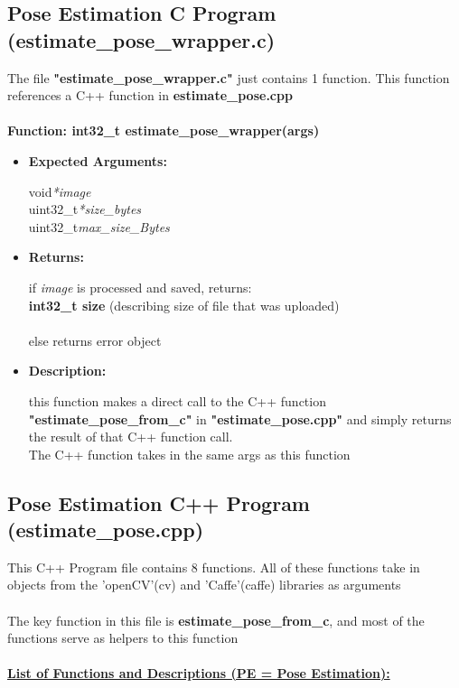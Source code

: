 \documentclass{scrreprt}
\begin{document}
\subsection{Pose Estimation C Program (estimate\_pose\_wrapper.c)}
The file \textbf{"estimate\_pose\_wrapper.c"} just contains 1 function. This function references a C++ function in \textbf{estimate\_pose.cpp}
\\\\
\textbf{Function: int32\_t estimate\_pose\_wrapper(args)}
\begin{itemize}
    \item \textbf{Expected Arguments:}

    void\quad\textit{*image}
    \\
    uint32\_t\quad\textit{*size\_bytes}
    \\
    uint32\_t\quad\textit{max\_size\_Bytes}

    \item\quad\textbf{Returns:}

    if \textit{image} is processed and saved, returns:\\\textbf{int32\_t size}
    (describing size of file that was uploaded)
    \\\\
    else returns error object

    \item \textbf{Description:}

    this function makes a direct call to the C++ function \textbf{"estimate\_pose\_from\_c"} in \textbf{"estimate\_pose.cpp"} and simply returns the result of that C++ function call.
    \\
    The C++ function takes in the same args as this function
\end{itemize}

\subsection{Pose Estimation C++ Program (estimate\_pose.cpp)}

This C++ Program file contains 8 functions. All of these functions take in objects from the 'openCV'(cv) and 'Caffe'(caffe) libraries as arguments
\\\\
The key function in this file is \textbf{estimate\_pose\_from\_c}, and most of the functions serve as helpers to this function
\\\\
\underline{ \textbf{List of Functions and Descriptions (PE = Pose Estimation):}}
\\
\end{document}
